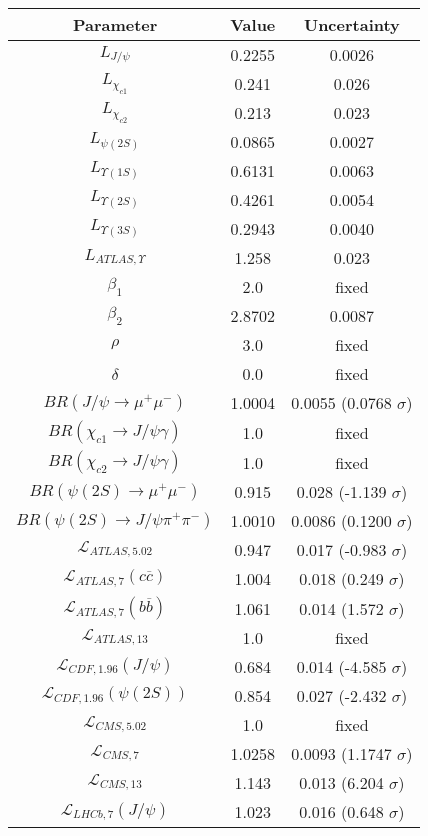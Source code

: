 \begin{table}[h!]
\centering
\begin{tabular}{c|c|c}
Parameter & Value & Uncertainty \\
\hline
$L_{J/\psi}$ & 0.2255 & 0.0026 \\
$L_{\chi_{c1}}$ & 0.241 & 0.026 \\
$L_{\chi_{c2}}$ & 0.213 & 0.023 \\
$L_{\psi(2S)}$ & 0.0865 & 0.0027 \\
$L_{\Upsilon(1S)}$ & 0.6131 & 0.0063 \\
$L_{\Upsilon(2S)}$ & 0.4261 & 0.0054 \\
$L_{\Upsilon(3S)}$ & 0.2943 & 0.0040 \\
$L_{ATLAS,\Upsilon}$ & 1.258 & 0.023 \\
$\beta_1$ & 2.0 & fixed \\
$\beta_2$ & 2.8702 & 0.0087 \\
$\rho$ & 3.0 & fixed \\
$\delta$ & 0.0 & fixed \\
$BR(J/\psi\rightarrow\mu^+\mu^-)$ & 1.0004 & 0.0055 (0.0768 $\sigma$) \\
$BR(\chi_{c1}\rightarrow J/\psi\gamma)$ & 1.0 & fixed \\
$BR(\chi_{c2}\rightarrow J/\psi\gamma)$ & 1.0 & fixed \\
$BR(\psi(2S)\rightarrow\mu^+\mu^-)$ & 0.915 & 0.028 (-1.139 $\sigma$) \\
$BR(\psi(2S)\rightarrow J/\psi\pi^+\pi^-)$ & 1.0010 & 0.0086 (0.1200 $\sigma$) \\
$\mathcal L_{ATLAS,5.02}$ & 0.947 & 0.017 (-0.983 $\sigma$) \\
$\mathcal L_{ATLAS,7}(c\overline c)$ & 1.004 & 0.018 (0.249 $\sigma$) \\
$\mathcal L_{ATLAS,7}(b\overline b)$ & 1.061 & 0.014 (1.572 $\sigma$) \\
$\mathcal L_{ATLAS,13}$ & 1.0 & fixed \\
$\mathcal L_{CDF,1.96}(J/\psi)$ & 0.684 & 0.014 (-4.585 $\sigma$) \\
$\mathcal L_{CDF,1.96}(\psi(2S))$ & 0.854 & 0.027 (-2.432 $\sigma$) \\
$\mathcal L_{CMS,5.02}$ & 1.0 & fixed \\
$\mathcal L_{CMS,7}$ & 1.0258 & 0.0093 (1.1747 $\sigma$) \\
$\mathcal L_{CMS,13}$ & 1.143 & 0.013 (6.204 $\sigma$) \\
$\mathcal L_{LHCb,7}(J/\psi)$ & 1.023 & 0.016 (0.648 $\sigma$) \\

\end{tabular}
\end{table}
